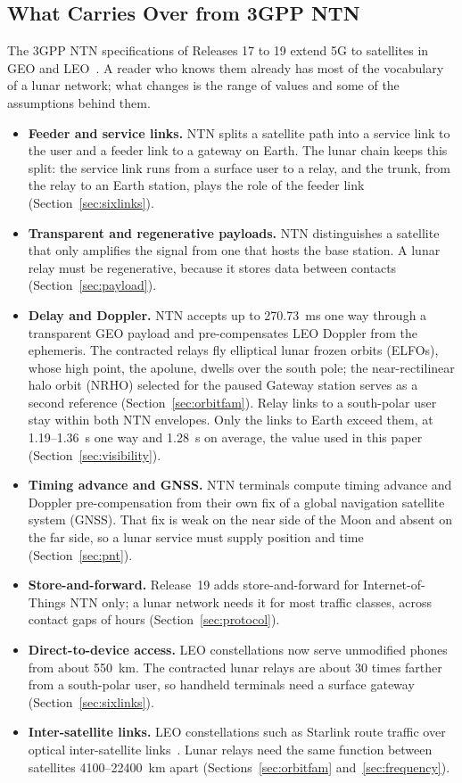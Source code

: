 \documentclass{IEEEoj}
\begin{document}
\subsection{What Carries Over from 3GPP NTN}
\label{sec:ntnbridge}
The 3GPP NTN specifications of Releases 17 to 19 extend 5G to satellites in GEO and LEO~\cite{lin2021ntn,giordani2021ntn,azari2022ntn}. A reader who knows them already has most of the vocabulary of a lunar network; what changes is the range of values and some of the assumptions behind them.
\begin{itemize}
\item \textbf{Feeder and service links.} NTN splits a satellite path into a service link to the user and a feeder link to a gateway on Earth. The lunar chain keeps this split: the service link runs from a surface user to a relay, and the trunk, from the relay to an Earth station, plays the role of the feeder link (Section~\ref{sec:sixlinks}).
\item \textbf{Transparent and regenerative payloads.} NTN distinguishes a satellite that only amplifies the signal from one that hosts the base station. A lunar relay must be regenerative, because it stores data between contacts (Section~\ref{sec:payload}).
\item \textbf{Delay and Doppler.} NTN accepts up to \SI{270.73}{ms} one way through a transparent GEO payload and pre-compensates LEO Doppler from the ephemeris. The contracted relays fly elliptical lunar frozen orbits (ELFOs), whose high point, the apolune, dwells over the south pole; the near-rectilinear halo orbit (NRHO) selected for the paused Gateway station serves as a second reference (Section~\ref{sec:orbitfam}). Relay links to a south-polar user stay within both NTN envelopes. Only the links to Earth exceed them, at \SI{1.19}{}--\SI{1.36}{\second} one way and \SI{1.28}{\second} on average, the value used in this paper (Section~\ref{sec:visibility}).
\item \textbf{Timing advance and GNSS.} NTN terminals compute timing advance and Doppler pre-compensation from their own fix of a global navigation satellite system (GNSS). That fix is weak on the near side of the Moon and absent on the far side, so a lunar service must supply position and time (Section~\ref{sec:pnt}).
\item \textbf{Store-and-forward.} Release~19 adds store-and-forward for Internet-of-Things NTN only; a lunar network needs it for most traffic classes, across contact gaps of hours (Section~\ref{sec:protocol}).
\item \textbf{Direct-to-device access.} LEO constellations now serve unmodified phones from about \SI{550}{km}. The contracted lunar relays are about 30 times farther from a south-polar user, so handheld terminals need a surface gateway (Section~\ref{sec:sixlinks}).
\item \textbf{Inter-satellite links.} LEO constellations such as Starlink route traffic over optical inter-satellite links~\cite{chaudhry2021laser}. Lunar relays need the same function between satellites \SI{4100}{}--\SI{22400}{km} apart (Sections~\ref{sec:orbitfam} and~\ref{sec:frequency}).
\end{itemize}
\end{document}
